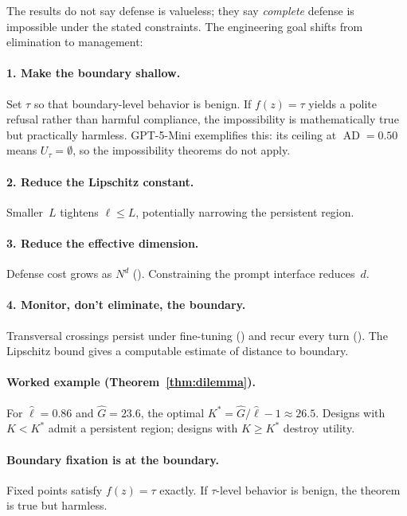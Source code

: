 \documentclass[11pt]{article}
\newcommand{\AD}{\operatorname{AD}}
\begin{document}
The results do not say defense is valueless; they say \emph{complete}
defense is impossible under the stated constraints. The engineering
goal shifts from elimination to management:

\paragraph{1. Make the boundary shallow.}
Set $\tau$ so that boundary-level behavior is benign. If $f(z) = \tau$
yields a polite refusal rather than harmful compliance, the
impossibility is mathematically true but practically harmless.
GPT-5-Mini exemplifies this: its ceiling at $\AD = 0.50$ means
$U_\tau = \emptyset$, so the impossibility theorems do not apply.

\paragraph{2. Reduce the Lipschitz constant.}
Smaller~$L$ tightens $\ell \leq L$, potentially narrowing the persistent region.

\paragraph{3. Reduce the effective dimension.}
Defense cost grows as $N^d$ (). Constraining the prompt
interface reduces~$d$.

\paragraph{4. Monitor, don't eliminate, the boundary.}
Transversal crossings persist under fine-tuning ()
and recur every turn (). The Lipschitz bound gives a
computable estimate of distance to boundary.

\paragraph{Worked example (Theorem~\ref{thm:dilemma}).}
For $\hat\ell = 0.86$ and $\hat G = 23.6$, the optimal $K^* = \hat G / \hat\ell - 1 \approx 26.5$. Designs with $K < K^*$ admit a persistent region; designs with $K \geq K^*$ destroy utility.

\paragraph{Boundary fixation is at the boundary.}
Fixed points satisfy $f(z) = \tau$ exactly. If $\tau$-level behavior
is benign, the theorem is true but harmless.
\end{document}
